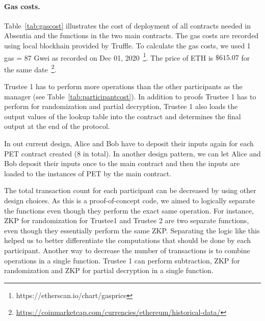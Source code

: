 
 





\paragraph{Gas costs.} 


Table~\ref{tab:gascost} illustrates the cost of deployment of all contracts needed in Absentia and the functions in the two main contracts. The gas costs are recorded using local blockhain provided by Truffle. To calculate the gas costs, we used 1 gas = 87 Gwei as recorded on Dec 01, 2020~\footnote{https://etherscan.io/chart/gasprice}. The price of ETH is $\$615.07$ for the same date~\footnote{\url{https://coinmarketcap.com/currencies/ethereum/historical-data/}}. %

Trustee 1 has to perform more operations than the other participants as the manager (see Table~\ref{tab:participantcost}). In addition to proofs Trustee 1 has to perform for randomization and partial decryption, Trustee 1 also loads the output values of the lookup table into the contract and determines the final output at the end of the protocol.

In out current design, Alice and Bob have to deposit their inputs again for each PET contract created (8 in total). In another design pattern, we can let Alice and Bob deposit their inputs once to the main contract and then the inputs are loaded to the instances of PET by the main contract. 

The total transaction count for each participant can be decreased by using other design choices. As this is a proof-of-concept code, we aimed to logically separate the functions even though they perform the exact same operation. For instance, ZKP for randomization for Trustee1 and Trustee 2 are two separate functions, even though they essentially perform the same ZKP. Separating the logic like this helped us to better differentiate the computations that should be done by each participant. Another way to decrease the number of transactions is to combine operations in a single function. Trustee 1 can perform subtraction, ZKP for randomization and ZKP for partial decryption in a single function.

